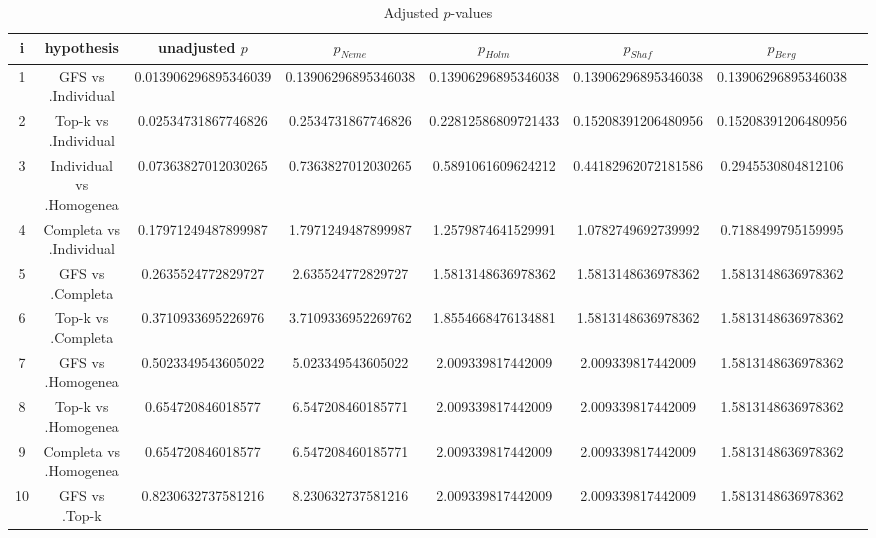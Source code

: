 \documentclass[a4paper,10pt]{article}
\begin{document}
\begin{landscape}
\begin{table}[!htp]
\centering\tiny
\caption{Adjusted $p$-values}
\begin{tabular}{cccccccc}
i&hypothesis&unadjusted $p$&$p_{Neme}$&$p_{Holm}$&$p_{Shaf}$&$p_{Berg}$\\
\hline
1&GFS vs .Individual&0.013906296895346039&0.13906296895346038&0.13906296895346038&0.13906296895346038&0.13906296895346038\\
2&Top-k vs .Individual&0.02534731867746826&0.2534731867746826&0.22812586809721433&0.15208391206480956&0.15208391206480956\\
3&Individual vs .Homogenea&0.07363827012030265&0.7363827012030265&0.5891061609624212&0.44182962072181586&0.2945530804812106\\
4&Completa vs .Individual&0.17971249487899987&1.7971249487899987&1.2579874641529991&1.0782749692739992&0.7188499795159995\\
5&GFS vs .Completa&0.2635524772829727&2.635524772829727&1.5813148636978362&1.5813148636978362&1.5813148636978362\\
6&Top-k vs .Completa&0.3710933695226976&3.7109336952269762&1.8554668476134881&1.5813148636978362&1.5813148636978362\\
7&GFS vs .Homogenea&0.5023349543605022&5.023349543605022&2.009339817442009&2.009339817442009&1.5813148636978362\\
8&Top-k vs .Homogenea&0.654720846018577&6.547208460185771&2.009339817442009&2.009339817442009&1.5813148636978362\\
9&Completa vs .Homogenea&0.654720846018577&6.547208460185771&2.009339817442009&2.009339817442009&1.5813148636978362\\
10&GFS vs .Top-k&0.8230632737581216&8.230632737581216&2.009339817442009&2.009339817442009&1.5813148636978362\\
\hline
\end{tabular}
\end{table}

\end{landscape}
\end{document}
